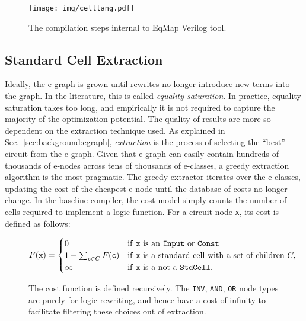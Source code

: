 \documentclass[10pt,letterpaper]{article}
\newcommand{\shortname}{EqMap}
\begin{document}
\begin{figure}
    \vspace{-1cm}
    \centering
    \texttt{[image: img/celllang.pdf]}
    \caption{The compilation steps internal to \shortname{} Verilog tool.}\label{fig:flow:egraph}
\end{figure}

\subsection{Standard Cell Extraction}\label{sec:baseline:extraction}
Ideally, the e-graph is grown until rewrites no longer introduce new terms into
the graph. In the literature, this is called \textit{equality saturation}. In
practice, equality saturation takes too long, and empirically it is not
required to capture the majority of the optimization potential. The quality of
results are more so dependent on the extraction technique used. As explained in
Sec.~\ref{sec:background:egraph}, \textit{extraction} is the process of
selecting the ``best'' circuit from the e-graph. Given that e-graph can easily
contain hundreds of thousands of e-nodes across tens of thousands of e-classes,
a greedy extraction algorithm is the most pragmatic. The greedy extractor
iterates over the e-classes, updating the cost of the cheapest e-node until the
database of costs no longer change. In the baseline compiler, the cost model
simply counts the number of cells required to implement a logic function. For a
circuit node \texttt{x}, its cost is defined as follows:

\begin{figure}[h]
    \[
        F(\texttt{x}) = \begin{cases}
            0                                         & \text{if \texttt{x} is an \texttt{Input} or \texttt{Const}}        \\
            1 + \sum_{\texttt{c} \in C} F(\texttt{c}) & \text{if \texttt{x} is a standard cell with a set of children } C, \\
            \infty                                    & \text{if \texttt{x} is a not a \texttt{StdCell}}.
        \end{cases}
    \]
    \caption{The cost function is defined recursively. The \texttt{INV}, \texttt{AND}, \texttt{OR} node types are purely for logic rewriting, and hence have a cost of infinity to facilitate filtering these choices out of extraction.}\label{fig:cost}
\end{figure}
\end{document}
